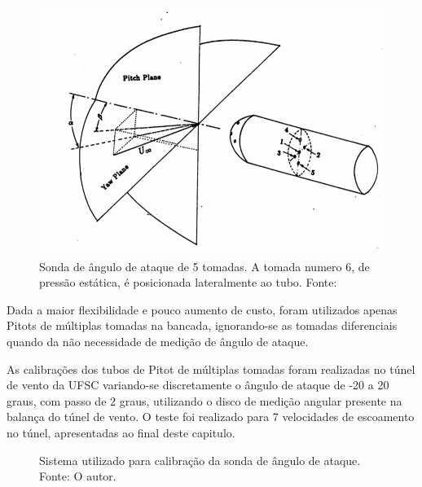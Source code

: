\begin{figure}[!ht]
    \centering
    \includegraphics[width=.8\linewidth]{figuras/outras/5holepitot.png}
    \caption{Sonda de ângulo de ataque de 5 tomadas. A tomada numero 6, de pressão estática, é posicionada lateralmente ao tubo. Fonte: \cite{lee1986calibration}}
    \label{fig:5_hole_probe}
\end{figure}

Dada a maior flexibilidade e pouco aumento de custo, foram utilizados apenas Pitots de múltiplas tomadas na bancada, ignorando-se as tomadas diferenciais quando da não necessidade de medição de ângulo de ataque. 

As calibrações dos tubos de Pitot de múltiplas tomadas foram realizadas no túnel de vento da UFSC variando-se discretamente o ângulo de ataque de -20 a 20 graus, com passo de 2 graus, utilizando o disco de medição angular presente na balança do túnel de vento. O teste foi realizado para 7 velocidades de escoamento no túnel, apresentadas ao final deste capitulo. 

\begin{figure}[!ht]
    \centering
    \caption{Sistema utilizado para calibração da sonda de ângulo de ataque. Fonte: O autor.}
        \label{sonda_tunel_1}
        \qquad
        \label{sonda_tunel_2}
\end{figure}

